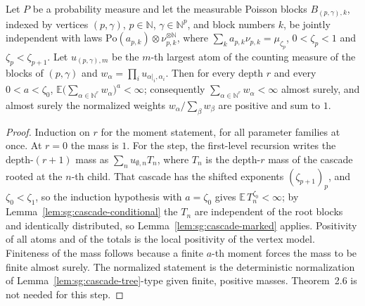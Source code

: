 \begin{theorem}
  \label{thm:sg:cascade-finite}
  \leanok
Let $P$ be a probability measure and let the measurable Poisson blocks
$B_{(p,\gamma),k}$, indexed by vertices $(p,\gamma)$, $p\in\mathbb N$,
$\gamma\in\mathbb N^p$, and block numbers $k$, be jointly independent with laws
$\mathrm{Po}(a_{p,k})\otimes\nu_{p,k}^{\otimes\mathbb N}$, where
$\sum_ka_{p,k}\nu_{p,k}=\mu_{\zeta_p}$, $0<\zeta_p<1$ and $\zeta_p<\zeta_{p+1}$.
Let $u_{(p,\gamma),m}$ be the $m$-th largest atom of the counting measure of the
blocks of $(p,\gamma)$ and $w_\alpha=\prod_i u_{\alpha|_i,\alpha_i}$. Then for every
depth $r$ and every $0<a<\zeta_0$, $\mathbb E\big(\sum_{\alpha\in\mathbb N^r}w_\alpha\big)^a<\infty$;
consequently $\sum_{\alpha\in\mathbb N^r}w_\alpha<\infty$ almost surely, and almost surely
the normalized weights $w_\alpha/\sum_\beta w_\beta$ are positive and sum to $1$.
\end{theorem}
\begin{proof}
  \leanok
Induction on $r$ for the moment statement, for all parameter families at once. At $r=0$
the mass is $1$. For the step, the first-level recursion writes the depth-$(r+1)$ mass as
$\sum_nu_{\emptyset,n}T_n$, where $T_n$ is the depth-$r$ mass of the cascade rooted at the
$n$-th child. That cascade has the shifted exponents $(\zeta_{p+1})_p$, and
$\zeta_0<\zeta_1$, so the induction hypothesis with $a=\zeta_0$ gives
$\mathbb E\,T_n^{\zeta_0}<\infty$; by Lemma~\ref{lem:sg:cascade-conditional} the $T_n$ are
independent of the root blocks and identically distributed, so
Lemma~\ref{lem:sg:cascade-marked} applies. Positivity of all atoms and of the totals is
the local positivity of the vertex model. Finiteness of the mass follows because a finite
$a$-th moment forces the mass to be finite almost surely. The normalized statement is the deterministic
normalization of Lemma~\ref{lem:sg:cascade-tree}-type given finite, positive masses.
Theorem~2.6 is not needed for this step.
\end{proof}

